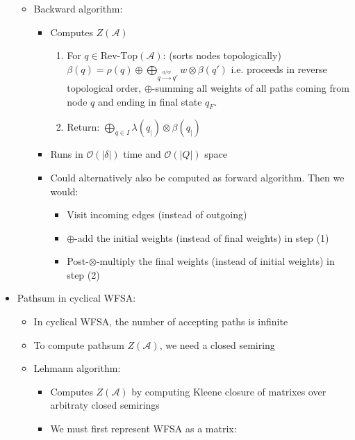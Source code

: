 \begin{itemize}
\begin{itemize}
        \item Backward algorithm:
        \begin{itemize}
            \item Computes $Z(\mathcal{A})$
            \begin{enumerate}
                \item For $q \in \textrm{Rev-Top}(\mathcal{A})$: (sorts nodes topologically)
                $
                \beta(q) = \rho(q) \oplus \bigoplus_{q \xrightarrow{a/w} q'} w \otimes \beta(q')
                $ i.e. proceeds in reverse topological order, $\oplus$-summing all weights of all paths coming from node $q$ and ending in final state $q_F$.
                \item Return:
                $
                \bigoplus_{q \in I} \lambda(q_\mid) \otimes \beta(q_\mid)
                $
            \end{enumerate}
            \item Runs in $\mathcal{O}(|\delta|)$ time and $\mathcal{O}(|Q|)$ space
            \item Could alternatively also be computed as forward algorithm. Then we would:
            \begin{itemize}
                \item Visit incoming edges (instead of outgoing)
                \item $\oplus$-add the initial weights (instead of final weights) in step (1)
                \item Post-$\otimes$-multiply the final weights (instead of initial weights) in step (2)
            \end{itemize}
        \end{itemize}
    \end{itemize}
    \item Pathsum in cyclical WFSA:
    \begin{itemize}
        \item In cyclical WFSA, the number of accepting paths is infinite
        \item To compute pathsum $Z(\mathcal{A})$, we need a closed semiring
        \item Lehmann algorithm:
        \begin{itemize}
            \item Computes $Z(\mathcal{A})$ by computing Kleene closure of matrixes over arbitraty closed semirings
            \item We must first represent WFSA as a matrix:

\end{itemize}
\end{itemize}
\end{itemize}
